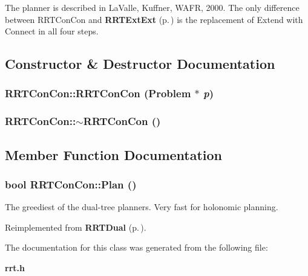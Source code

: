 The planner is described in La\-Valle, Kuffner, WAFR, 2000. The only difference between RRTCon\-Con and {\bf RRTExt\-Ext} {\rm (p.\,\pageref{class_RRTExtExt})} is the replacement of Extend with Connect in all four steps. 



\subsection{Constructor \& Destructor Documentation}
\subsubsection{\setlength{\rightskip}{0pt plus 5cm}RRTCon\-Con::RRTCon\-Con ({\bf Problem} $\ast$ {\em p})}\label{class_RRTConCon_a0}


\subsubsection{\setlength{\rightskip}{0pt plus 5cm}RRTCon\-Con::$\sim$RRTCon\-Con ()\hspace{0.3cm}{\tt  [inline, virtual]}}\label{class_RRTConCon_a1}




\subsection{Member Function Documentation}
\subsubsection{\setlength{\rightskip}{0pt plus 5cm}bool RRTCon\-Con::Plan ()\hspace{0.3cm}{\tt  [virtual]}}\label{class_RRTConCon_a2}


The greediest of the dual-tree planners. Very fast for holonomic planning.



Reimplemented from {\bf RRTDual} {\rm (p.\,\pageref{class_RRTDual_a2})}.

The documentation for this class was generated from the following file:\begin{CompactItemize}
\item 
{\bf rrt.h}\end{CompactItemize}
